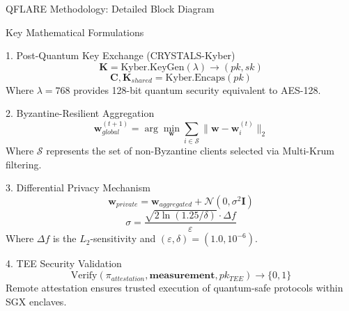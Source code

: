 \documentclass[aspectratio=169,11pt]{beamer}
\begin{document}
\begin{frame}{QFLARE Methodology: Detailed Block Diagram}
\end{frame}

\begin{frame}{Key Mathematical Formulations}

\begin{block}{1. Post-Quantum Key Exchange (CRYSTALS-Kyber)}
$$\mathbf{K} = \text{Kyber.KeyGen}(\lambda) \rightarrow (pk, sk)$$
$$\mathbf{C}, \mathbf{K}_{shared} = \text{Kyber.Encaps}(pk)$$
Where $\lambda = 768$ provides 128-bit quantum security equivalent to AES-128.
\end{block}

\begin{block}{2. Byzantine-Resilient Aggregation}
$$\mathbf{w}_{global}^{(t+1)} = \arg\min_{\mathbf{w}} \sum_{i \in \mathcal{S}} \|\mathbf{w} - \mathbf{w}_i^{(t)}\|_2$$
Where $\mathcal{S}$ represents the set of non-Byzantine clients selected via Multi-Krum filtering.
\end{block}

\begin{block}{3. Differential Privacy Mechanism}
$$\mathbf{w}_{private} = \mathbf{w}_{aggregated} + \mathcal{N}(0, \sigma^2 \mathbf{I})$$
$$\sigma = \frac{\sqrt{2\ln(1.25/\delta)} \cdot \Delta f}{\varepsilon}$$
Where $\Delta f$ is the $L_2$-sensitivity and $(\varepsilon, \delta) = (1.0, 10^{-6})$.
\end{block}

\begin{block}{4. TEE Security Validation}
$$\text{Verify}(\pi_{attestation}, \mathbf{measurement}, pk_{TEE}) \rightarrow \{0,1\}$$
Remote attestation ensures trusted execution of quantum-safe protocols within SGX enclaves.
\end{block}

\end{frame}
\end{document}
